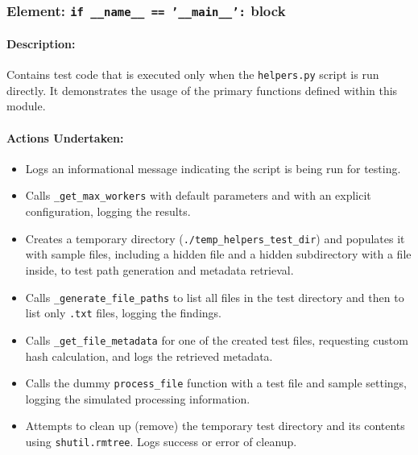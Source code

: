 \documentclass{article}
\begin{document}
\subsubsection{Element: \texttt{if \_\_name\_\_ == '\_\_main\_\_':} block}
\paragraph{Description:} Contains test code that is executed only when the \texttt{helpers.py} script is run directly. It demonstrates the usage of the primary functions defined within this module.
\paragraph{Actions Undertaken:}
\begin{itemize}
    \item Logs an informational message indicating the script is being run for testing.
    \item Calls \texttt{\_get\_max\_workers} with default parameters and with an explicit configuration, logging the results.
    \item Creates a temporary directory (\texttt{./temp\_helpers\_test\_dir}) and populates it with sample files, including a hidden file and a hidden subdirectory with a file inside, to test path generation and metadata retrieval.
    \item Calls \texttt{\_generate\_file\_paths} to list all files in the test directory and then to list only \texttt{.txt} files, logging the findings.
    \item Calls \texttt{\_get\_file\_metadata} for one of the created test files, requesting custom hash calculation, and logs the retrieved metadata.
    \item Calls the dummy \texttt{process\_file} function with a test file and sample settings, logging the simulated processing information.
    \item Attempts to clean up (remove) the temporary test directory and its contents using \texttt{shutil.rmtree}. Logs success or error of cleanup.
\end{itemize}
\end{document}

